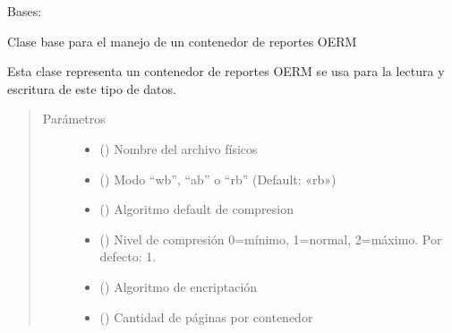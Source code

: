 \documentclass[a4paper,12pt,spanish]{sphinxmanual}
\begin{document}

\begin{fulllineitems}
\label{\detokenize{openerm.Database:openerm.Database.Database}}
Bases: 

Clase base para el manejo de un contenedor de reportes OERM

Esta clase representa un contenedor de reportes OERM se usa
para la lectura y escritura de este tipo de datos.
\begin{quote}\begin{description}
\item[{Parámetros}] \leavevmode\begin{itemize}
\item {} 
 () \textendash{} Nombre del archivo físicos

\item {} 
 () \textendash{} Modo  “wb”, “ab” o “rb” (Default: «rb»)

\item {} 
 () \textendash{} Algoritmo default de compresion

\item {} 
 () \textendash{} Nivel de compresión 0=mínimo, 1=normal, 2=máximo. Por defecto: 1.

\item {} 
 () \textendash{} Algoritmo de encriptación

\item {} 
 () \textendash{} Cantidad de páginas por contenedor


\end{itemize}
\end{description}
\end{quote}
\end{fulllineitems}
\end{document}
